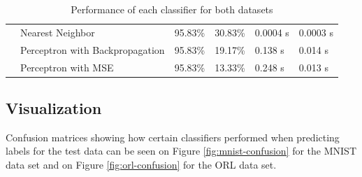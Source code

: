 \begin{table}[!htbp]
\begin{tabular}{|l|l|l|l|l|l|}
    \cline{2-6}
            & Nearest Neighbor                & 95.83\%              & 30.83\%              & 0.0004 s              & 0.0003 s    \\ 
    \cline{2-6}
            & Perceptron with Backpropagation & 95.83\%              & 19.17\%              & 0.138 s              & 0.014 s    \\ 
    \cline{2-6}
            & Perceptron with MSE             & 95.83\%              & 13.33\%              & 0.248 s              & 0.013 s    \\
    \hline
    \end{tabular}
    \caption{Performance of each classifier for both datasets}
    \label{tab:classifiers-performance}
\end{table}

\subsection{Visualization}
Confusion matrices showing how certain classifiers performed when predicting labels for the test data can be seen on Figure \ref{fig:mnist-confusion} for the MNIST data set and on Figure \ref{fig:orl-confusion} for the ORL data set. 

